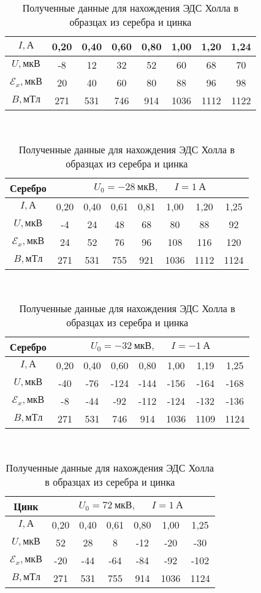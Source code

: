 \documentclass{lab}
\begin{document}
\begin{itemize}
\begin{table}[H]
{\begin{tabular}{|c|ccccccc|}
	$I, А$					& 0,20	& 0,40	& 0,60	& 0,80	& 1,00	& 1,20	& 1,24		\\ \hline
	$U, мкВ$				& -8	& 12	& 32	& 52	& 60	& 68	& 70		\\ \hline
	$\mathscr{E}_x, мкВ$	& 20	& 40	& 60	& 80	& 88	& 96	& 98		\\ \hline
	$B, мТл$				& 271	& 531	& 746	& 914	& 1036	& 1112	& 1122		\\ \hline
\end{tabular}
\\[0.1cm]
\begin{tabular}{|c|ccccccc|}
	\hline
	Серебро					& \multicolumn{7}{c|}{$ U_0 = -28~мкВ, ~~~~~~~ I = 1~А $}	\\ \hline
	$I, А$					& 0,20	& 0,40	& 0,61	& 0,81	& 1,00	& 1,20	& 1,25		\\ \hline
	$U, мкВ$				& -4	& 24	& 48	& 68	& 80	& 88	& 92		\\ \hline
	$\mathscr{E}_x, мкВ$	& 24	& 52	& 76	& 96	& 108	& 116	& 120		\\ \hline
	$B, мТл$				& 271	& 531	& 755	& 921	& 1036	& 1112	& 1124		\\ \hline
\end{tabular}
\\[0.1cm]
\begin{tabular}{|c|ccccccc|}
	\hline
	Серебро					& \multicolumn{7}{c|}{$ U_0 = -32~мкВ, ~~~~~~~ I = -1~А $}	\\ \hline
	$I, А$					& 0,20	& 0,40	& 0,60	& 0,80	& 1,00	& 1,19	& 1,25		\\ \hline
	$U, мкВ$				& -40	& -76	& -124	& -144	& -156	& -164	& -168		\\ \hline
	$\mathscr{E}_x, мкВ$	& -8	& -44	& -92	& -112	& -124	& -132	& -136		\\ \hline
	$B, мТл$				& 271	& 531	& 746	& 914	& 1036	& 1109	& 1124		\\ \hline
\end{tabular}
\\[0.1cm]
\begin{tabular}{|c|cccccc|}
	\hline
	Цинк					& \multicolumn{6}{c|}{$ U_0 = 72~мкВ, ~~~~~~~ I = 1~А $}	\\ \hline
	$I, А$					& 0,20	& 0,40	& 0,61	& 0,80	& 1,00	& 1,25				\\ \hline
	$U, мкВ$				& 52	& 28	& 8		& -12	& -20	& -30				\\ \hline
	$\mathscr{E}_x, мкВ$	& -20	& -44	& -64	& -84	& -92	& -102				\\ \hline
	$B, мТл$				& 271	& 531	& 755	& 914	& 1036	& 1124				\\ \hline
\end{tabular}
}
	\caption{\footnotesize Полученные данные для нахождения ЭДС Холла в образцах из серебра и цинка}
	\label{tabBig}
	\renewcommand{\arraystretch}{1}
\end{table}


\end{itemize}
\end{document}
